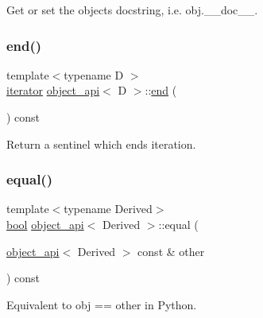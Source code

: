 Get or set the object\textquotesingle{}s docstring, i.\+e. {\ttfamily obj.\+\_\+\+\_\+doc\+\_\+\+\_\+}. 

\mbox{\label{classobject__api_a67b1b3d151adc273eeda39837e63f581}} 
\subsubsection{\texorpdfstring{end()}{end()}}
{\footnotesize\ttfamily template$<$typename D $>$ \\
\mbox{\hyperlink{classiterator}{iterator}} \mbox{\hyperlink{classobject__api}{object\+\_\+api}}$<$ D $>$\+::\mbox{\hyperlink{_s_d_l__opengl_8h_a432111147038972f06e049e18a837002}{end}} (\begin{DoxyParamCaption}{ }\end{DoxyParamCaption}) const}



Return a sentinel which ends iteration. 

\mbox{\label{classobject__api_ae1d3648ad3568f13a4e9f28556bb6e99}} 
\subsubsection{\texorpdfstring{equal()}{equal()}}
{\footnotesize\ttfamily template$<$typename Derived$>$ \\
\mbox{\hyperlink{asdl_8h_af6a258d8f3ee5206d682d799316314b1}{bool}} \mbox{\hyperlink{classobject__api}{object\+\_\+api}}$<$ Derived $>$\+::equal (\begin{DoxyParamCaption}\item[{\mbox{\hyperlink{classobject__api}{object\+\_\+api}}$<$ Derived $>$ const \&}]{other }\end{DoxyParamCaption}) const\hspace{0.3cm}{\ttfamily [inline]}}



Equivalent to obj == other in Python. 

\mbox{\label{classobject__api_a6e7d5542b300b4ef13c65c58124a410a}} 
